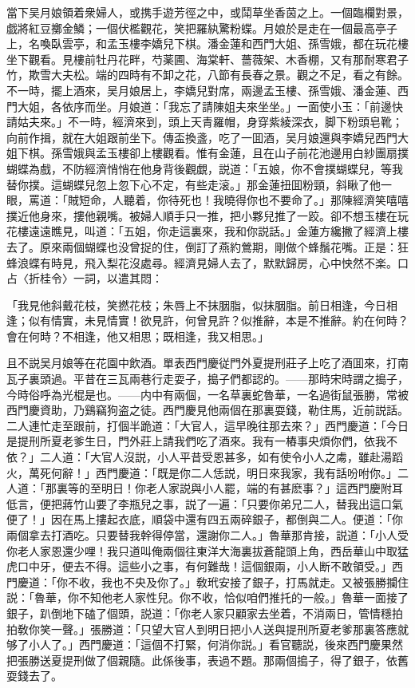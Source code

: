 當下吴月娘領着衆婦人，或携手遊芳徑之中，或鬦草坐香茵之上。一個臨欄對景，戯將紅豆擲金鱗；一個伏檻觀花，笑把羅紈驚粉蝶。月娘於是走在一個最高亭子上，名喚臥雲亭，和孟玉樓李嬌兒下棋。潘金蓮和西門大姐、孫雪娥，都在玩花樓坐下觀看。見樓前牡丹花畔，芍薬圃、海棠軒、薔薇架、木香棚，又有那耐寒君子竹，欺雪大夫松。端的四時有不卸之花，八節有長春之景。觀之不足，看之有餘。不一時，擺上酒來，吴月娘居上，李嬌兒對席，兩邊孟玉樓、孫雪娥、潘金蓮、西門大姐，各依序而坐。月娘道：「我忘了請陳姐夫來坐坐。」一面使小玉：「前邊快請姑夫來。」不一時，經濟來到，頭上天青羅帽，身穿紫綾深衣，脚下粉頭皂靴；向前作揖，就在大姐跟前坐下。傳盃換盞，吃了一囬酒，吴月娘還與李嬌兒西門大姐下棋。孫雪娥與孟玉樓卻上樓觀看。惟有金蓮，且在山子前花池邊用白紗團扇撲蝴蝶為戲，不防經濟悄悄在他身背後觀覷，説道：「五娘，你不會撲蝴蝶兒，等我替你撲。這蝴蝶兒忽上忽下心不定，有些走滚。」那金蓮扭囬粉頸，斜瞅了他一眼，罵道：「賊短命，人聽着，你待死也！我曉得你也不要命了。」那陳經濟笑嘻嘻撲近他身來，摟他親嘴。被婦人順手只一推，把小夥兒推了一跤。卻不想玉樓在玩花樓遠遠瞧見，叫道：「五姐，你走這裏來，我和你説話。」金蓮方纔撇了經濟上樓去了。原來兩個蝴蝶也没曾捉的住，倒訂了燕約鶯期，剛做个蜂鬚花嘴。正是：狂蜂浪蝶有時見，飛入梨花沒處尋。經濟見婦人去了，默默歸房，心中怏然不楽。口占〈折桂令〉一詞，以遣其悶：

「我見他斜戴花枝，笑撚花枝；朱唇上不抹胭脂，似抹胭脂。前日相逢，今日相逢；似有情實，未見情實！欲見許，何曾見許？似推辭，本是不推辭。約在何時？會在何時？不相逢，他又相思；既相逢，我又相思。」

且不説吴月娘等在花園中飲酒。單表西門慶従門外夏提刑莊子上吃了酒囬來，打南瓦子裏頭過。平昔在三瓦兩巷行走耍子，搗子們都認的。——那時宋時謂之搗子，今時俗呼為光棍是也。——内中有兩個，一名草裏蛇魯華，一名過街鼠張勝，常被西門慶資助，乃鷄竊狗盗之徒。西門慶見他兩個在那裏耍錢，勒住馬，近前説話。二人連忙走至跟前，打個半跪道：「大官人，這早晚往那去來？」西門慶道：「今日是提刑所夏老爹生日，門外莊上請我們吃了酒來。我有一樁事央煩你們，依我不依？」二人道：「大官人沒説，小人平昔受恩甚多，如有使令小人之䖏，雖赴湯蹈火，萬死何辭！」西門慶道：「既是你二人恁説，明日來我家，我有話吩咐你。」二人道：「那裏等的至明日！你老人家説與小人罷，端的有甚麽事？」這西門慶附耳低言，便把蔣竹山要了李瓶兒之事，説了一遍：「只要你弟兄二人，替我出這口氣便了！」因在馬上摟起衣底，順袋中還有四五兩碎銀子，都倒與二人。便道：「你兩個拿去打酒吃。只要替我幹得停當，還謝你二人。」魯華那肯接，説道：「小人受你老人家恩還少哩！我只道叫俺兩個往東洋大海裏拔蒼龍頭上角，西岳華山中取猛虎口中牙，便去不得。這些小之事，有何難哉！這個銀兩，小人断不敢領受。」西門慶道：「你不收，我也不央及你了。」敎玳安接了銀子，打馬就走。又被張勝攔住説：「魯華，你不知他老人家性兒。你不收，恰似咱們推托的一般。」魯華一面接了銀子，趴倒地下磕了個頭，説道：「你老人家只顧家去坐着，不消兩日，管情穩拍拍敎你笑一聲。」張勝道：「只望大官人到明日把小人送與提刑所夏老爹那裏答應就够了小人了。」西門慶道：「這個不打緊，何消你説。」看官聽説，後來西門慶果然把張勝送夏提刑做了個親隨。此係後事，表過不題。那兩個搗子，得了銀子，依舊耍錢去了。

